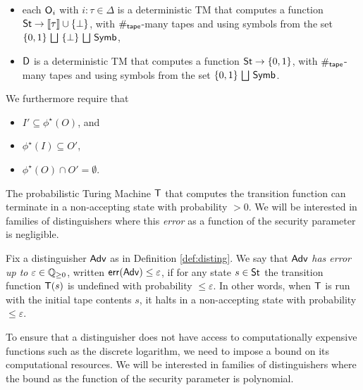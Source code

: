 \begin{definition}[Distinguishers]
\begin{itemize}
\item each $\mathsf{O}_{i}$ with $i : \tau \in \Delta$ is a deterministic TM that computes a function $\mathsf{St} \to \llbracket \tau \rrbracket \cup \{\bot\}$, with $\#_{\mathsf{tape}}$-many tapes and using symbols from the set $\{0,1\} \, \bigsqcup \ \{\bot\} \, \bigsqcup \, \mathsf{Symb}$,

\item $\mathsf{D}$ is a deterministic TM that computes a function $\mathsf{St} \to \{0,1\}$, with $\#_{\mathsf{tape}}$-many tapes and using symbols from the set $\{0,1\} \, \bigsqcup \, \mathsf{Symb}$.
\end{itemize}
We furthermore require that
\begin{itemize}
\item $I' \subseteq \phi^\star(O)$, and
\item $\phi^\star(I) \subseteq O'$,
\item $\phi^\star(O) \cap O' = \emptyset$.
\end{itemize}
\end{definition}

\noindent The probabilistic Turing Machine $\mathsf{T}$ that computes the transition function can terminate in a non-accepting state with probability $> 0$. We will be interested in families of distinguishers where this \emph{error} as a function of the security parameter is negligible.

\begin{definition}
Fix a distinguisher $\mathsf{Adv}$ as in Definition \ref{def:disting}. We say that $\mathsf{Adv}$ \emph{has error up to} $\varepsilon \in \mathbb{Q}_{\geq 0}$, written $\mathsf{err}(\mathsf{Adv}) \leq \varepsilon$, if for any state $s \in \mathsf{St}$ the transition function $\mathsf{T}(s)$ is undefined with probability $\leq \varepsilon$. In other words, when $\mathsf{T}$ is run with the initial tape contents $s$, it halts in a non-accepting state with probability $\leq \varepsilon$.
\end{definition}

\noindent To ensure that a distinguisher does not have access to computationally expensive functions such as the discrete logarithm, we need to impose a bound on its computational resources. We will be interested in families of distinguishers where the bound as the function of the security parameter is polynomial.

